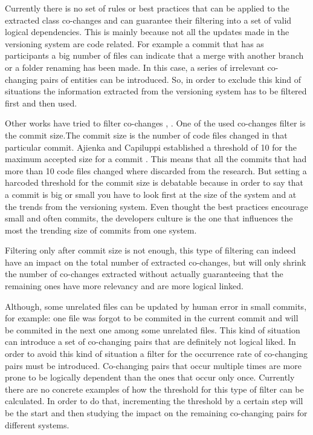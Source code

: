 \documentclass[12pt]{mitthesis}
\begin{document}
Currently there is no set of rules or best practices that can be applied to the extracted class co-changes and can guarantee their filtering into a set of valid logical dependencies.
This is mainly because not all the updates made in the versioning system are code related. For example a commit that has as participants a big number of files can indicate that a merge with another branch or a folder renaming has been made. In this case, a series of irrelevant co-changing pairs of entities can be introduced. So, in order to exclude this kind of situations the information extracted from the versioning system has to be filtered first and then used.

Other works have tried to filter co-changes \cite{Oliva:2011:ISL:2067853.2068086}, \cite{DBLP:journals/jss/AjienkaC17}. One of the used co-changes filter is the commit size.The commit size is the number of code files changed in that particular commit. 
Ajienka and Capiluppi established a threshold of 10 for the maximum accepted size for a commit \cite{DBLP:journals/jss/AjienkaC17}. This means that all the commits that had more than 10 code files changed where discarded from the research. But setting a harcoded threshold for the commit size is debatable because in order to say that a commit is big or small you have to look first at the size of the system and at the trends from the versioning system. Even thought the best practices encourage small and often commits, the developers culture is the one that influences the most the trending size of commits from one system.

Filtering only after commit size is not enough, this type of filtering can indeed have an impact on the total number of extracted co-changes, but will only shrink the number of co-changes extracted without actually guaranteeing that the remaining ones have more relevancy and are more logical linked.

Although, some unrelated files can be updated by human error in small commits, for example: one file was forgot to be commited in the current commit and will be commited in the next one among some unrelated files. This kind of situation can introduce a set of co-changing pairs that are definitely not logical liked. In order to avoid this kind of situation a filter for the occurrence rate of co-changing pairs must be introduced. Co-changing pairs that occur multiple times are more prone to be logically dependent than the ones that occur only once. Currently there are no concrete examples of how the threshold for this type of filter can be calculated. In order to do that, incrementing the threshold by a certain step will be the start and then studying the impact on the remaining co-changing pairs for different systems. 
\end{document}
